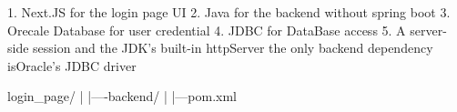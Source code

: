 
1. Next.JS for the login page UI
2. Java for the backend without spring boot
3. Orecale Database for user credential 
4. JDBC for DataBase access
5. A server-side session and the JDK's built-in httpServer the only backend dependency isOracle's JDBC driver



login_page/
|
|----backend/
      |
      |---pom.xml